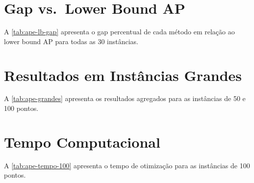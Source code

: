 \section{Gap vs.\ Lower Bound AP}

A \autoref{tab:ape-lb-gap} apresenta o gap percentual de cada m\'etodo em rela\c{c}\~ao ao lower bound AP para todas as 30 instâncias.

\begin{table}[htbp]
\centering
\caption{Gap percentual em rela\c{c}\~ao ao lower bound AP.}
\label{tab:ape-lb-gap}

\end{table}

\section{Resultados em Instâncias Grandes}

A \autoref{tab:ape-grandes} apresenta os resultados agregados para as instâncias de 50 e 100 pontos.

\begin{table}[htbp]
\centering
\caption{Makespan nas instâncias grandes.}
\label{tab:ape-grandes}

\end{table}

\section{Tempo Computacional}

A \autoref{tab:ape-tempo-100} apresenta o tempo de otimiza\c{c}\~ao para as instâncias de 100 pontos.

\begin{table}[htbp]
\centering
\caption{Tempo de otimiza\c{c}\~ao nas instâncias de 100 pontos.}
\label{tab:ape-tempo-100}

\end{table}
